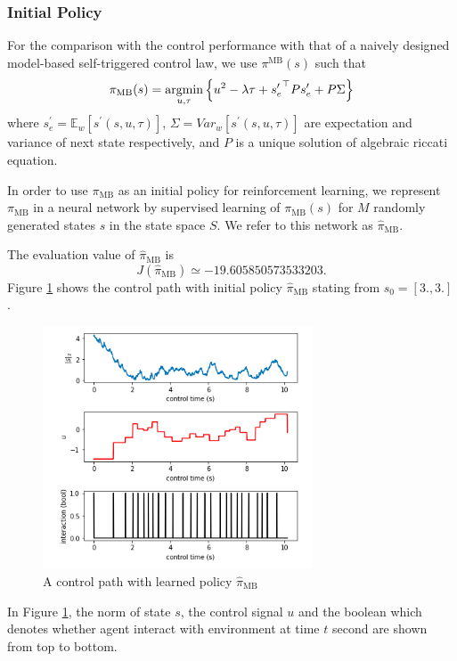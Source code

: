 \documentclass[english, dvipdfmx]{ampmt}             %
\newcommand{\argmin}{\mathop{\rm argmin}\limits}
\newcommand{\expect}{\mathbb{E}}
\begin{document}
\subsubsection{Initial Policy}
For the comparison with the control performance with that of a naively designed model-based self-triggered control law, we use $\pi^{\textrm{MB}}(s)$ such that
\begin{equation}
	\pi_{\textrm{MB}}(s) = \argmin_{u,\tau} \left\{u^2 - \lambda\tau + {s^{\prime}_e}^{\top}Ps^{\prime} _e+ P\Sigma\right\}
\end{equation}
where $s^{\prime}_e=\expect_{w}[s^{\prime}(s,u,\tau)]$, $\Sigma=Var_w[s^{\prime}(s,u,\tau)]$ are  expectation and variance of next state respectively, and $P$ is a unique solution of algebraic riccati equation.\par
In order to use $\pi_{\textrm{MB}}$ as an initial policy for reinforcement learning, we represent $\pi_{\textrm{MB}}$ in a neural network by supervised learning of $\pi_{\textrm{MB}}(s)$ for $M$ randomly generated states $s$ in the state space $S$. We refer to this network as $\hat{\pi}_{\textrm{MB}}$.\par
The evaluation value of $\hat{\pi}_{\textrm{MB}}$ is
\begin{equation}
	J(\hat{\pi}_{\textrm{MB}}) \simeq -19.605850573533203.
\end{equation}
Figure \ref{naiive} shows the control path with initial policy $\hat{\pi}_{\textrm{MB}}$ stating from $s_0 = [3., 3.]$.
\begin{figure}[H]
	\centering
 	\includegraphics[width=8cm]{naiive.png}
 	\caption{A control path with learned policy $\hat{\pi}_{\textrm{MB}}$} \label{naiive}
\end{figure}
In Figure \ref{naiive}, the norm of state $s$, the control signal $u$ and the boolean which denotes whether agent interact with environment at time $t$ second are shown from top to bottom.
\end{document}
